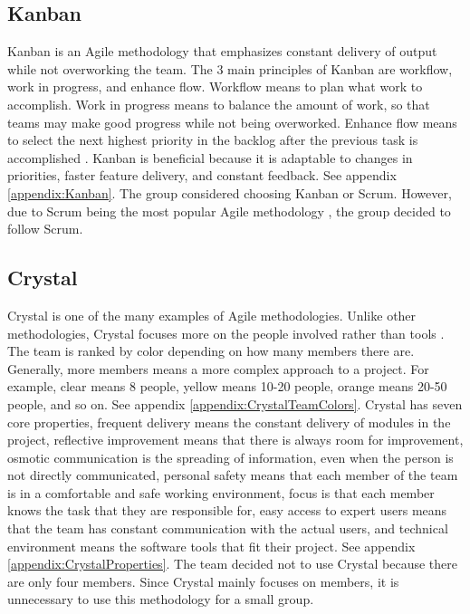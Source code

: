 \subsection{Kanban}
Kanban is an Agile methodology that emphasizes constant delivery of output while not overworking the team. The 3 main principles of Kanban are workflow, work in progress, and enhance flow. Workflow means to plan what work to accomplish. Work in progress means to balance the amount of work, so that teams may make good progress while not being overworked. Enhance flow means to select the next highest priority in the backlog after the previous task is accomplished \cite{ref:ExtremeProgramming}. Kanban is beneficial because it is adaptable to changes in priorities, faster feature delivery, and constant feedback. See appendix \ref{appendix:Kanban}. The group considered choosing Kanban or Scrum. However, due to Scrum being the most popular Agile methodology \cite{ref:ScrumPopular}, the group decided to follow Scrum.

\subsection{Crystal}
Crystal is one of the many examples of Agile methodologies. Unlike other methodologies, Crystal focuses more on the people involved rather than tools \cite{ref:Crystal}. The team is ranked by color depending on how many members there are. Generally, more members means a more complex approach to a project. For example, clear means 8 people, yellow means 10-20 people, orange means 20-50 people, and so on. See appendix \ref{appendix:CrystalTeamColors}. Crystal has seven core properties, frequent delivery means the constant delivery of modules in the project, reflective improvement means that there is always room for improvement, osmotic communication is the spreading of information, even when the person is not directly communicated, personal safety means that each member of the team is in a comfortable and safe working environment, focus is that each member knows the task that they are responsible for, easy access to expert users means that the team has constant communication with the actual users, and technical environment means the software tools that fit their project. See appendix \ref{appendix:CrystalProperties}. The team decided not to use Crystal because there are only four members. Since Crystal mainly focuses on members, it is unnecessary to use this methodology for a small group.

